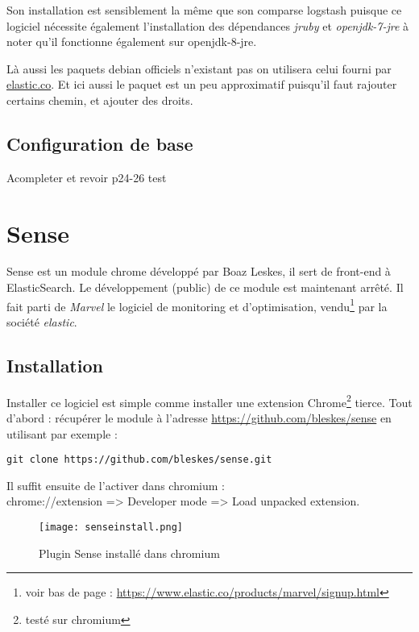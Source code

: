 Son installation est sensiblement la même que son comparse logstash puisque ce logiciel 
nécessite également l'installation des dépendances \emph{jruby} et \emph{openjdk-7-jre}
à noter qu'il fonctionne également sur openjdk-8-jre.

Là aussi les paquets debian officiels n'existant pas on utilisera celui fourni par 
\href{https://download.elastic.co/elasticsearch/elasticsearch/elasticsearch-1.5.1.deb}{elastic.co}.
Et ici aussi le paquet est un peu approximatif puisqu'il faut rajouter certains 
chemin, et ajouter des droits.

\subsection{Configuration de base}


Acompleter et revoir
p24-26
 test


\section{Sense}
Sense est un module chrome développé par Boaz Leskes, il sert de front-end à ElasticSearch.
Le développement (public) de ce module est maintenant arrêté. Il fait parti de 
\emph{Marvel} le logiciel de monitoring et d'optimisation, vendu\footnote{voir bas 
de page : \url{https://www.elastic.co/products/marvel/signup.html}} 
par la société \emph{elastic}.


\subsection{Installation}
Installer ce logiciel est simple comme installer une extension Chrome\footnote{testé sur chromium}
tierce.
Tout d'abord : récupérer le module à l'adresse \url{https://github.com/bleskes/sense}
en utilisant par exemple : 
\begin{lstlisting}[style=code,label=lst:gitclonesense]
git clone https://github.com/bleskes/sense.git
\end{lstlisting}

Il suffit ensuite de l'activer dans chromium :\\ 
chrome://extension => Developer mode => Load unpacked extension.

\begin{figure}[H]
\center
\texttt{[image: senseinstall.png]}
\label{fig:senseinstall}
\caption{Plugin Sense installé dans chromium}
\end{figure}

